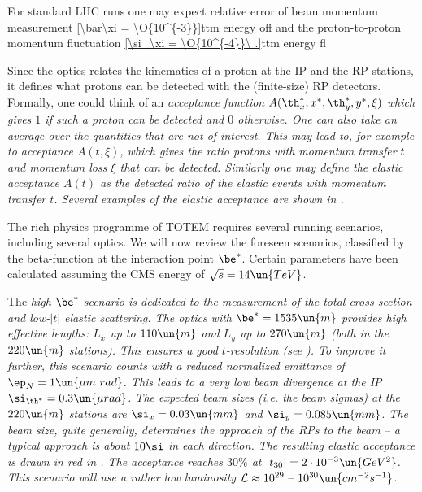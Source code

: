 For standard LHC runs one may expect relative error of beam momentum measurement
\eqref{\bar\xi = \O{10^{-3}}}{ttm energy off}
and the proton-to-proton momentum fluctuation
\eqref{\si_\xi = \O{10^{-4}}\ .}{ttm energy fl}

Since the optics  relates the kinematics of a proton at the IP and the RP stations, it defines what protons can be detected with the (finite-size) RP detectors. Formally, one could think of an \em{acceptance} function $A(\th_x^*, x^*, \th_y^*, y^*, \xi)$ which gives $1$ if such a proton can be detected and $0$ otherwise. One can also take an average over the quantities that are not of interest. This may lead to, for example to acceptance $A(t, \xi)$, which gives the ratio protons with momentum transfer $t$ and momentum loss $\xi$ that can be detected. Similarly one may define the \em{elastic acceptance} $A(t)$ as the detected ratio of the elastic events with momentum transfer $t$. Several examples of the elastic acceptance are shown in .



The rich physics programme of TOTEM requires several running scenarios, including several optics. We will now review the foreseen scenarios, classified by the beta-function at the interaction point $\be^*$. Certain parameters have been calculated assuming the CMS energy of $\sqrt s = 14\un{TeV}$.

\> The \em{high $\be^*$} scenario is dedicated to the measurement of the total cross-section and low-$|t|$ elastic scattering. The optics with $\be^* = 1535\un{m}$ provides high effective lengths: $L_x$ up to $110\un{m}$ and $L_y$ up to $270\un{m}$ (both in the $220\un{m}$ stations). This ensures a good $t$-resolution (see ). To improve it further, this scenario counts with a reduced normalized emittance of $\ep_N=1\un{\mu m\ rad}$. This leads to a very low beam divergence at the IP $\si_{\th^*} = 0.3\un{\mu rad}$. The expected beam sizes (i.e. the beam sigmas) at the $220\un{m}$ stations are $\si_x = 0.03\un{mm}$ and $\si_y = 0.085\un{mm}$. The beam size, quite generally, determines the approach of the RPs to the beam -- a typical approach is about $10\si$ in each direction. The resulting elastic acceptance is drawn in red in . The acceptance reaches $30\percent$ at $|t_{30}| = 2\cdot10^{-3}\un{GeV^2}$. This scenario will use a rather low luminosity ${\cal L} \approx 10^{29} \hbox{ -- } 10^{30}\un{cm^{-2}s^{-1}}$.

